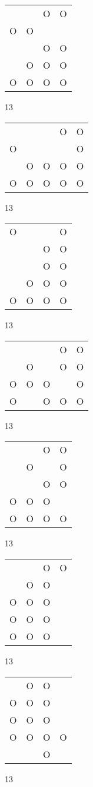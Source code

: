 \begin{tabular}{|m{0.2cm}m{0.2cm}m{0.2cm}m{0.2cm}|}\hline
 & &O&O\\
O&O& & \\
 & &O&O\\
 &O&O&O\\
O&O&O&O\\
\hline\end{tabular}13
\begin{tabular}{|m{0.2cm}m{0.2cm}m{0.2cm}m{0.2cm}m{0.2cm}|}\hline
 & & &O&O\\
O& & & &O\\
 &O&O&O&O\\
O&O&O&O&O\\
\hline\end{tabular}13
\begin{tabular}{|m{0.2cm}m{0.2cm}m{0.2cm}m{0.2cm}|}\hline
O& & &O\\
 & &O&O\\
 & &O&O\\
 &O&O&O\\
O&O&O&O\\
\hline\end{tabular}13
\begin{tabular}{|m{0.2cm}m{0.2cm}m{0.2cm}m{0.2cm}m{0.2cm}|}\hline
 & & &O&O\\
 &O& &O&O\\
O&O&O& &O\\
O& &O&O&O\\
\hline\end{tabular}13
\begin{tabular}{|m{0.2cm}m{0.2cm}m{0.2cm}m{0.2cm}|}\hline
 & &O&O\\
 &O& &O\\
 & &O&O\\
O&O&O& \\
O&O&O&O\\
\hline\end{tabular}13
\begin{tabular}{|m{0.2cm}m{0.2cm}m{0.2cm}m{0.2cm}|}\hline
 & &O&O\\
 &O&O& \\
O&O&O& \\
O&O&O& \\
O&O&O& \\
\hline\end{tabular}13
\begin{tabular}{|m{0.2cm}m{0.2cm}m{0.2cm}m{0.2cm}|}\hline
 &O&O& \\
O&O&O& \\
O&O&O& \\
O&O&O&O\\
 & &O& \\
\hline\end{tabular}13
